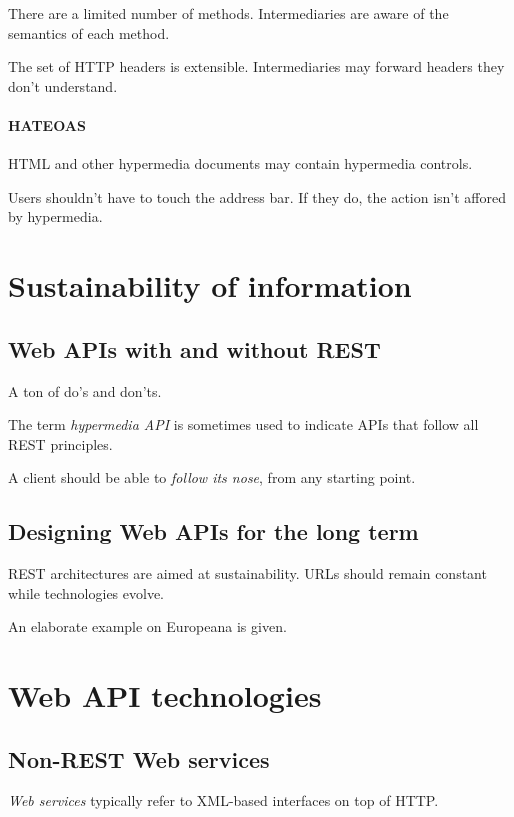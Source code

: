 \documentclass{report}
\begin{document}
There are a limited number of methods.
Intermediaries are aware of the semantics of each method.

The set of HTTP headers is extensible.
Intermediaries may forward headers they don't understand.

\paragraph{HATEOAS} 

HTML and other hypermedia documents
may contain hypermedia controls.

Users shouldn't have to touch the address bar.
If they do, the action isn't affored by hypermedia.

\section{Sustainability of information}

\subsection{Web APIs with and without REST}

A ton of do's and don'ts.

The term \textit{hypermedia API} is sometimes used
to indicate APIs that follow all REST principles.

A client should be able to \textit{follow its nose},
from any starting point.

\subsection{Designing Web APIs for the long term}

REST architectures are aimed at sustainability.
URLs should remain constant while technologies evolve.

An elaborate example on Europeana is given.

\section{Web API technologies}

\subsection{Non-REST Web services}

\textit{Web services} typically refer to XML-based interfaces
on top of HTTP.
\end{document}
